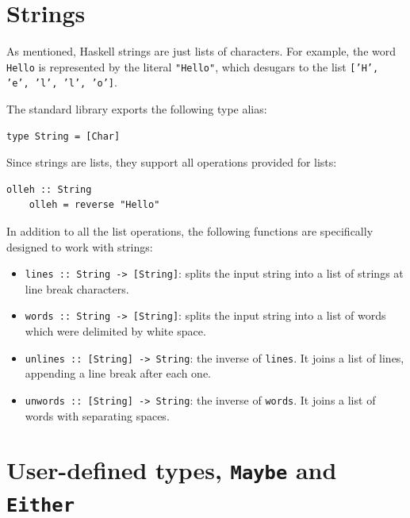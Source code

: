 \documentclass[UdineBachThesis,american,11pt]{PhdThesis}
\begin{document}
  \section{Strings}
  \label{section:strings}

  As mentioned, Haskell strings are just lists of characters. For example, the
  word \mbox{\texttt{Hello}} is represented by the literal
  \mbox{\texttt{"Hello"}}, which desugars to the list
  \mbox{\texttt{['H', 'e', 'l', 'l', 'o']}}.

  \pagebreak

  The standard library exports the following type alias:

  \begin{Verbatim}[gobble=4,fontsize=\small]
    type String = [Char]
  \end{Verbatim}

  Since strings are lists, they support all operations provided for lists:

  \begin{Verbatim}[gobble=4,fontsize=\small]
    olleh :: String
    olleh = reverse "Hello"
  \end{Verbatim}

  In addition to all the list operations, the following functions are
  specifically designed to work with strings:

  \begin{itemize}
    \item \mbox{\texttt{lines :: String -> [String]}}: splits the input string
    into a list of strings at line break characters.

    \item \mbox{\texttt{words :: String -> [String]}}: splits the input string
    into a list of words which were delimited by white space.

    \item \mbox{\texttt{unlines :: [String] -> String}}: the inverse of
    \mbox{\texttt{lines}}. It joins a list of lines, appending a line break
    after each one.

    \item \mbox{\texttt{unwords :: [String] -> String}}: the inverse of
    \mbox{\texttt{words}}. It joins a list of words with separating spaces.
  \end{itemize}

  \section{User-defined types, \texttt{Maybe} and \texttt{Either}}
  \label{section:user-defined-types}
\end{document}
